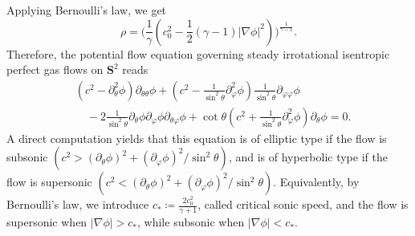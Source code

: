 \documentclass[10pt,a4paper]{amsart}
\numberwithin{equation}{section}
\begin{document}
Applying Bernoulli's law, we get 
\begin{equation}\label{rho with phi}
    \rho=\Big(\frac{1}{\gamma}(c^2_0-\frac{1}{2}(\gamma-1)|\nabla \phi|^2)\Big)^{\frac{1}{\gamma-1}}.
\end{equation}
Therefore, the potential flow equation governing steady irrotational isentropic perfect gas flows on $\mathbf{S}^2$ reads
\begin{align}\label{potential flow in s2}
	&(c^2-\partial^2_\theta\phi)\partial_{\theta\theta}\phi+(c^2-\frac{1}{\sin^2\theta }\partial^2_\varphi\phi)\frac{1}{\sin^2\theta }\partial_{\varphi\varphi}\phi\nonumber\\
	&\quad-2\frac{1}{\sin^2\theta }\partial_{\theta}\phi\partial_{\varphi}\phi\partial_{\theta\varphi}\phi+\cot\theta(c^2+\frac{1}{\sin^2\theta }\partial^2_\varphi\phi)\partial_{\theta}\phi=0.
\end{align}
A direct computation yields that
this equation is of elliptic type if the flow is subsonic $(c^2 > (\partial_\theta\phi)^2 +(\partial_\varphi\phi)^2/\sin^2\theta)$,
and is of hyperbolic type if the flow is supersonic  $(c^2 < (\partial_\theta\phi)^2 +(\partial_\varphi\phi)^2/\sin^2\theta)$. Equivalently, by Bernoulli's law, we introduce $c_*\coloneqq\frac{2c^2_0}{\gamma+1}$, called critical sonic speed, and the flow is supersonic when $|\nabla\phi|>c_*$, while subsonic when $|\nabla\phi|<c_*$.
	
\end{document}
